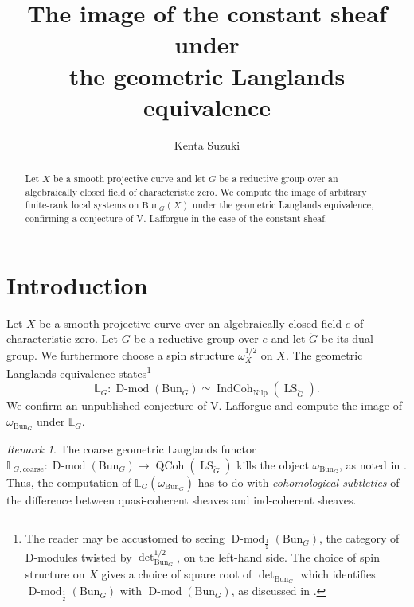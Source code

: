 \documentclass[11pt]{amsart}
\title[The constant sheaf under geometric Langlands]{The image of the constant sheaf under\\ the geometric Langlands equivalence}
\author{Kenta Suzuki}
\newcommand{\Bun}{{\mathrm{Bun}}}
\newcommand{\Nilp}{\mathrm{Nilp}}
\DeclareMathOperator{\QCoh}{QCoh}
\DeclareMathOperator{\Dmod}{D-mod}
\DeclareMathOperator{\IndCoh}{IndCoh}
\DeclareMathOperator{\LS}{LS}
\theoremstyle{remark}
\newtheorem*{remark}{Remark}
\theoremstyle{definition}
\begin{document}
\begin{abstract}
Let $X$ be a smooth projective curve and let $G$ be a reductive group over an algebraically closed field of characteristic zero. We compute the image of arbitrary finite-rank local systems on $\Bun_G(X)$ under the geometric Langlands equivalence, confirming a conjecture of V. Lafforgue in the case of the constant sheaf.
\end{abstract}

\maketitle

\section{Introduction} 
Let $X$ be a smooth projective curve over an algebraically closed field $e$ of characteristic zero. Let $G$ be a reductive group over $e$ and let $\check G$ be its dual group. We furthermore choose a spin structure $\omega_X^{1/2}$ on $X$.
The geometric Langlands equivalence \cite{GLC1,GLC2,GLC3,GLC4,GLC5} states\footnote{The reader may be accustomed to seeing $\Dmod_{\frac12}(\Bun_G)$, the category of D-modules twisted by $\det_{\Bun_G}^{1/2}$, on the left-hand side. The choice of spin structure on $X$ gives a choice of square root of $\det_{\Bun_G}$ which identifies $\Dmod_{\frac12}(\Bun_G)$ with $\Dmod(\Bun_G)$, as discussed in \cite[\S1.1.5]{GLC1}.
}
    \[
\mathbb L_G\colon\Dmod(\Bun_G)\simeq\IndCoh_{\Nilp}(\LS_{\check G}).
\]
We confirm an unpublished conjecture of V. Lafforgue and compute the image of $\omega_{\Bun_G}$ under $\mathbb L_G$. 
\begin{remark}
    The coarse geometric Langlands functor $\mathbb L_{G,\mathrm{coarse}}\colon\Dmod(\Bun_G)\to\QCoh(\LS_{\check G})$ kills the object $\omega_{\Bun_G}$, as noted in \cite[\S2.1.4]{GLC1}. Thus, the computation of $\mathbb L_G(\omega_{\Bun_G})$ has to do with \emph{cohomological subtleties} of the difference between quasi-coherent sheaves and ind-coherent sheaves.
\end{remark}
\end{document}
